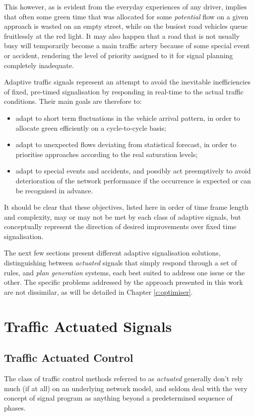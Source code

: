 This however, as is evident from the everyday experiences of any driver, implies that often some green time that was allocated for some \emph{potential} flow on a given approach is wasted on an empty street, while on the busiest road vehicles queue fruitlessly at the red light. It may also happen that a road that is not usually busy will temporarily become a main traffic artery because of some special event or accident, rendering the level of priority assigned to it for signal planning completely inadequate.

Adaptive traffic signals represent an attempt to avoid the inevitable inefficiencies of fixed, pre-timed signalisation by responding in real-time to the actual traffic conditions. Their main goals are therefore to:
\begin{itemize}
\item adapt to short term fluctuations in the vehicle arrival pattern, in order to allocate green efficiently on a cycle-to-cycle basis;
\item adapt to unexpected flows deviating from statistical forecast, in order to prioritise approaches according to the real saturation levels;
\item adapt to special events and accidents, and possibly act preemptively to avoid deterioration of the network performance if the occurrence is expected or can be recognised in advance.
\end{itemize}
It should be clear that these objectives, listed here in order of time frame length and complexity, may or may not be met by each class of adaptive signals, but conceptually represent the direction of desired improvements over fixed time signalisation. 

The next few sections present different adaptive signalisation solutions, distinguishing between \emph{actuated} signals that simply respond through a set of rules, and \emph{plan generation} systems, each best suited to address one issue or the other. The specific problems addressed by the approach presented in this work are not dissimilar, as will be detailed in Chapter \ref{c:optimiser}.

\section{Traffic Actuated Signals}


\subsection{Traffic Actuated Control}
The class of traffic control methods referred to as \emph{actuated} generally don’t rely much (if
at all) on an underlying network model, and seldom deal with the very concept of signal
program as anything beyond a predetermined sequence of phases.

